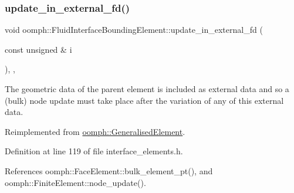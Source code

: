 \mbox{\label{classoomph_1_1FluidInterfaceBoundingElement_ab2639a1585fe815bed2d2a3d69fa5164}} 
\subsubsection{\texorpdfstring{update\+\_\+in\+\_\+external\+\_\+fd()}{update\_in\_external\_fd()}}
{\footnotesize\ttfamily void oomph\+::\+Fluid\+Interface\+Bounding\+Element\+::update\+\_\+in\+\_\+external\+\_\+fd (\begin{DoxyParamCaption}\item[{const unsigned \&}]{i }\end{DoxyParamCaption})\hspace{0.3cm}{\ttfamily [inline]}, {\ttfamily [protected]}, {\ttfamily [virtual]}}



The geometric data of the parent element is included as external data and so a (bulk) node update must take place after the variation of any of this external data. 



Reimplemented from \hyperlink{classoomph_1_1GeneralisedElement_af740b8c507dde03700cff5d196e28019}{oomph\+::\+Generalised\+Element}.



Definition at line 119 of file interface\+\_\+elements.\+h.



References oomph\+::\+Face\+Element\+::bulk\+\_\+element\+\_\+pt(), and oomph\+::\+Finite\+Element\+::node\+\_\+update().

\mbox{\label{classoomph_1_1FluidInterfaceBoundingElement_a1a715427e2037278891c06afd5d096fb}} 

